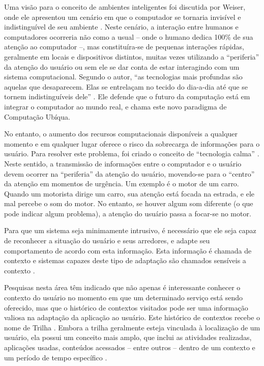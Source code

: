 \documentclass[times, 10pt, twocolumn]{article}
\begin{document}
Uma visão para o conceito de ambientes inteligentes foi discutida por Weiser, onde ele apresentou um cenário em que o computador se tornaria invisível e indistinguível de seu ambiente \cite{weiser91}. Neste cenário, a interação entre humanos e computadores ocorreria não como a usual -- onde o humano dedica 100\% de sua atenção ao computador --, mas constituíra-se de pequenas interações rápidas, geralmente em locais e dispositivos distintos, muitas vezes utilizando a ``periferia'' da atenção do usuário \cite{weiser96} ou sem ele se dar conta de estar interagindo com um sistema computacional. Segundo o autor, ``as tecnologias mais profundas são aquelas que desaparecem. Elas se entrelaçam no tecido do dia-a-dia até que se tornem indistinguíveis dele'' \cite{weiser91}. Ele defende que o futuro da computação está em integrar o computador ao mundo real, e chama este novo paradigma de Computação Ubíqua.

No entanto, o aumento dos recursos computacionais disponíveis a qualquer momento e em qualquer lugar oferece o risco da sobrecarga de informações para o usuário. Para resolver este problema, foi criado o conceito de ``tecnologia calma'' \cite{weiser96}. Neste sentido, a transmissão de informações entre o computador e o usuário devem ocorrer na ``periferia'' da atenção do usuário, movendo-se para o ``centro'' da atenção em momentos de urgência. Um exemplo é o motor de um carro. Quando um motorista dirige um carro, sua atenção está focada na estrada, e ele mal percebe o som do motor. No entanto, se houver algum som diferente (o que pode indicar algum problema), a atenção do usuário passa a focar-se no motor.

Para que um sistema seja minimamente intrusivo, é necessário que ele seja capaz de reconhecer a situação do usuário e seus arredores, e adapte seu comportamento de acordo com esta informação. Esta informação é chamada de contexto e sistemas capazes deste tipo de adaptação são chamados sensíveis a contexto \cite{satyanarayanan01,dey2001}. 

Pesquisas nesta área têm indicado que não apenas é interessante conhecer o contexto do usuário no momento em que um determinado serviço está sendo oferecido, mas que o histórico de contextos visitados pode ser uma informação valiosa na adaptação da aplicação ao usuário. Este histórico de contextos recebe o nome de Trilha \cite{silva10}. Embora a trilha geralmente esteja vinculada à localização de um usuário, ela possui um conceito mais amplo, que inclui as atividades realizadas, aplicações usadas, conteúdos acessados -- entre outros -- dentro de um contexto e um período de tempo específico \cite{silva09}.
\end{document}
